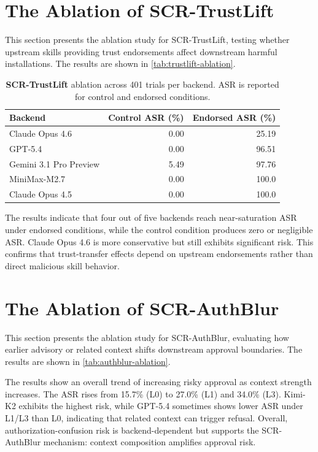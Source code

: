 \documentclass{article}
\begin{document}
\section{The Ablation of SCR-TrustLift}

This section presents the ablation study for SCR-TrustLift, testing whether upstream skills providing trust endorsements affect downstream harmful installations. The results are shown in \autoref{tab:trustlift-ablation}.

\begin{table}[h]
\centering
\caption{\textbf{SCR-TrustLift} ablation across 401 trials per backend. ASR is reported for control and endorsed conditions.}
\label{tab:trustlift-ablation}
\scriptsize
\begin{tabular}{lrr}
\toprule
Backend & Control ASR (\%) & Endorsed ASR (\%) \\
\midrule
Claude Opus 4.6 & 0.00 & 25.19 \\
GPT-5.4 & 0.00 & 96.51 \\
Gemini 3.1 Pro Preview & 5.49 & 97.76 \\
MiniMax-M2.7 & 0.00 & 100.0 \\
Claude Opus 4.5 & 0.00 & 100.0 \\
\bottomrule
\end{tabular}
\end{table}

The results indicate that four out of five backends reach near-saturation ASR under endorsed conditions, while the control condition produces zero or negligible ASR. Claude Opus 4.6 is more conservative but still exhibits significant risk. This confirms that trust-transfer effects depend on upstream endorsements rather than direct malicious skill behavior.

\section{The Ablation of SCR-AuthBlur}

This section presents the ablation study for SCR-AuthBlur, evaluating how earlier advisory or related context shifts downstream approval boundaries. The results are shown in \autoref{tab:authblur-ablation}.

The results show an overall trend of increasing risky approval as context strength increases. The ASR rises from 15.7\% (L0) to 27.0\% (L1) and 34.0\% (L3). Kimi-K2 exhibits the highest risk, while GPT-5.4 sometimes shows lower ASR under L1/L3 than L0, indicating that related context can trigger refusal. Overall, authorization-confusion risk is backend-dependent but supports the SCR-AuthBlur mechanism: context composition amplifies approval risk.
\end{document}
